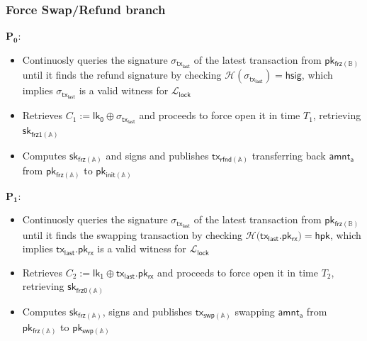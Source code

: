 \documentclass{article}      	%
\begin{document}
\subsubsection*{Force Swap/Refund branch}
\: $\mathbf{P_0:}$
\begin{itemize}
    \item Continuosly queries the signature $\sigma_{\mathsf{tx_{last}}}$ of the latest transaction from $\mathsf{pk_{frz(\mathbb{B})}}$ until it finds the refund signature by checking $\mathcal{H}(\sigma_{\mathsf{tx_{last}}}) = \mathsf{hsig}$, which implies $\sigma_{\mathsf{tx_{last}}}$ is a valid witness for $\mathcal{L}_{\mathsf{lock}}$
    \item Retrieves $C_1 := \mathsf{lk_0} \oplus \sigma_{\mathsf{tx_{last}}}$ and proceeds to force open it in time $T_1$, retrieving $\mathsf{sk_{frz1(\mathbb{A})}}$
    \item Computes $\mathsf{sk_{frz(\mathbb{A})}}$ and signs and publishes $\mathsf{tx_{rfnd(\mathbb{A})}}$ transferring back $\mathsf{amnt_a}$ from $\mathsf{pk_{frz(\mathbb{A})}}$ to $\mathsf{pk_{init(\mathbb{A})}}$
\end{itemize}
\: $\mathbf{P_1:}$
\begin{itemize}
    \item Continuosly queries the signature $\sigma_{\mathsf{tx_{last}}}$ of the latest transaction from $\mathsf{pk_{frz(\mathbb{B})}}$ until it finds the swapping transaction by checking $\mathcal{H}{(\mathsf{tx_{last}}.\mathsf{pk_{rx}}}) = \mathsf{hpk}$, which implies $\mathsf{tx_{last}}.\mathsf{pk_{rx}}$ is a valid witness for $\mathcal{L}_{\mathsf{lock}}$
    \item Retrieves $C_2 := \mathsf{lk_1} \oplus \mathsf{tx_{last}}.\mathsf{pk_{rx}}$ and proceeds to force open it in time $T_2$, retrieving $\mathsf{sk_{frz0(\mathbb{A})}}$
    \item Computes $\mathsf{sk_{frz(\mathbb{A})}}$, signs and publishes $\mathsf{tx_{swp(\mathbb{A})}}$ swapping $\mathsf{amnt_a}$ from $\mathsf{pk_{frz(\mathbb{A})}}$ to $\mathsf{pk_{swp(\mathbb{A})}}$
\end{itemize}
\end{document}
